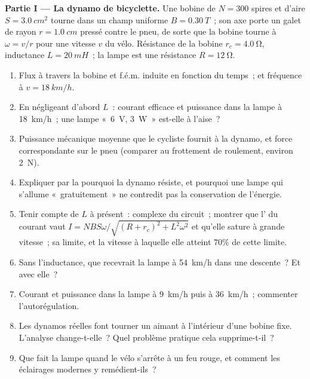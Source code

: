 \begin{problem}
\medskip
\noindent\textbf{Partie I --- La dynamo de bicyclette.}
Une bobine de $N = 300$ spires et d'aire $S = \qty{3.0}{cm^2}$ tourne dans un
champ uniforme $B = \qty{0.30}{T}$~; son axe porte un galet de rayon
$r = \qty{1.0}{cm}$ pressé contre le pneu, de sorte que la bobine tourne à
$\omega = v/r$ pour une vitesse $v$ du vélo. Résistance de la bobine $r_c = \qty{4.0}{\ohm}$,
inductance $L = \qty{20}{mH}$~; la lampe est une résistance $R = \qty{12}{\ohm}$.
\begin{enumerate}
  \item Flux à travers la bobine et f.é.m. induite en fonction du temps~;
         et fréquence à $v = \qty{18}{km/h}$.
  \item En négligeant d'abord $L$~: courant efficace et puissance dans la
        lampe à \qty{18}{km/h}~; une lampe «~\qty{6}{V}, \qty{3}{W}~» est-elle à l'aise~?
  \item Puissance mécanique moyenne que le cycliste fournit à la dynamo, et
        force correspondante sur le pneu (comparer au frottement de
        roulement, environ \qty{2}{N}).
  \item Expliquer par la  pourquoi la dynamo résiste, et pourquoi
        une lampe qui s'allume «~gratuitement~» ne contredit pas la
        conservation de l'énergie.
  \item Tenir compte de $L$ à présent~:  complexe du circuit~;
        montrer que l' du courant vaut $I = NBS\omega/\sqrt{(R + r_c)^2 + L^2\omega^2}$
        et qu'elle sature à grande vitesse~; sa limite, et la vitesse à
        laquelle elle atteint $70\%$ de cette limite.
  \item Sans l'inductance, que recevrait la lampe à \qty{54}{km/h} dans une
        descente~? Et avec elle~?
  \item Courant et puissance dans la lampe à \qty{9}{km/h} puis à \qty{36}{km/h}~;
        commenter l'autorégulation.
  \item Les dynamos réelles font tourner un aimant à l'intérieur d'une bobine
        fixe. L'analyse change-t-elle~? Quel problème pratique cela supprime-t-il~?
  \item Que fait la lampe quand le vélo s'arrête à un feu rouge, et comment
        les éclairages modernes y remédient-ils~?
\end{enumerate}


\end{problem}
